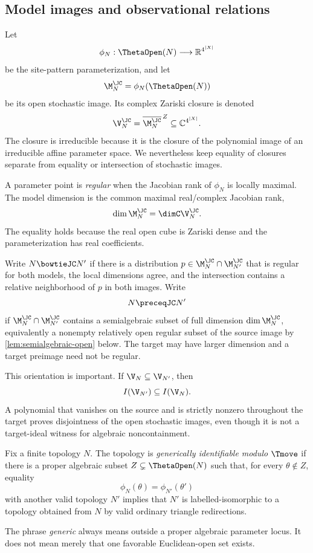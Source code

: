 \subsection{Model images and observational relations}

Let
\[
\phi_N:\ThetaOpen(N)\longrightarrow\mathbb R^{4^{|X|}}
\]
be the site-pattern parameterization, and let
\[
\M_N^{\JC}=\phi_N(\ThetaOpen(N))
\]
be its open stochastic image.  Its complex Zariski closure is denoted
\[
\V_N^{\JC}=\overline{\M_N^{\JC}}^{\,Z}\subseteq\mathbb C^{4^{|X|}}.
\]
The closure is irreducible because it is the closure of the polynomial image of an irreducible affine parameter space.  We nevertheless keep equality of closures separate from equality or intersection of stochastic images.

A parameter point is \emph{regular} when the Jacobian rank of $\phi_N$ is locally maximal.  The model dimension is the common maximal real/complex Jacobian rank,
\[
\dim \M_N^{\JC}=\dimC \V_N^{\JC}.
\]
The equality holds because the real open cube is Zariski dense and the parameterization has real coefficients.

\begin{definition}
Write $N\bowtieJC N'$ if there is a distribution $p\in\M_N^{\JC}\cap\M_{N'}^{\JC}$ that is regular for both models, the local dimensions agree, and the intersection contains a relative neighborhood of $p$ in both images.  Write
\[
N\preceqJC N'
\]
if $\M_N^{\JC}\cap\M_{N'}^{\JC}$ contains a semialgebraic subset of full dimension $\dim\M_N^{\JC}$, equivalently a nonempty relatively open regular subset of the source image by \cref{lem:semialgebraic-open} below.  The target may have larger dimension and a target preimage need not be regular.
\end{definition}

This orientation is important.  If $\V_N\subseteq\V_{N'}$, then
\[
I(\V_{N'})\subseteq I(\V_N).
\]
A polynomial that vanishes on the source and is strictly nonzero throughout the target proves disjointness of the open stochastic images, even though it is not a target-ideal witness for algebraic noncontainment.

\begin{definition}
Fix a finite topology $N$.  The topology is \emph{generically identifiable modulo $\Tmove$} if there is a proper algebraic subset $Z\subsetneq\ThetaOpen(N)$ such that, for every $\theta\notin Z$, equality
\[
\phi_N(\theta)=\phi_{N'}(\theta')
\]
with another valid topology $N'$ implies that $N'$ is labelled-isomorphic to a topology obtained from $N$ by valid ordinary triangle redirections.
\end{definition}

The phrase \emph{generic} always means outside a proper algebraic parameter locus.  It does not mean merely that one favorable Euclidean-open set exists.
